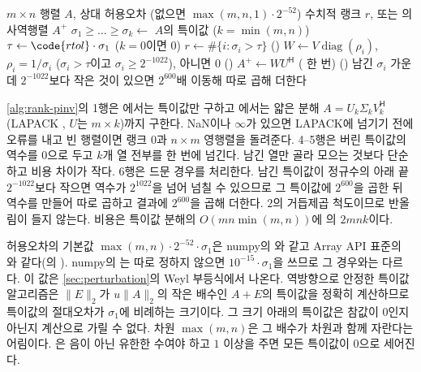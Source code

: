 \begin{algorithm}[htbp]
\begin{algorithmic}[1]
\Require $m\times n$ 행렬 $A$, 상대 허용오차  (없으면 $\max(m,n,1)\cdot2^{-52}$)
\Ensure 수치적 랭크 $r$, 또는 의사역행렬 $A^+$
\State $\sigma_1\ge\dots\ge\sigma_k\gets$ $A$의 특이값 ($k=\min(m,n)$) 
\State $\tau\gets\code{rtol}\cdot\sigma_1$ ($k=0$이면 $0$)
\State $r\gets\#\{i:\sigma_i>\tau\}$ 
\State () $W\gets V\operatorname{diag}(\rho_i)$, $\rho_i=1/\sigma_i$ ($\sigma_i>\tau$이고 $\sigma_i\ge2^{-1022}$), 아니면 $0$ 
\State () $A^+\gets WU^{\mathsf H}$ ( 한 번)
\State () 남긴 $\sigma_i$ 가운데 $2^{-1022}$보다 작은 것이 있으면 $2^{600}$배 이동해 따로 곱해 더한다
\end{algorithmic}
\caption{수치적 랭크와 의사역행렬 (stardust , )}
\label{alg:rank-pinv}
\end{algorithm}

\cref{alg:rank-pinv}의 1행은 에서는 특이값만 구하고 에서는 얇은 분해 $A=U_k\Sigma_kV_k^{\mathsf H}$(LAPACK , $U$는 $m\times k$)까지 구한다. NaN이나 $\infty$가 있으면 LAPACK에 넘기기 전에 오류를 내고 빈 행렬이면 랭크 $0$과 $n\times m$ 영행렬을 돌려준다. 4--5행은 버린 특이값의 역수를 $0$으로 두고 $k$개 열 전부를  한 번에 넘긴다. 남긴 열만 골라 모으는 것보다 단순하고 비용 차이가 작다. 6행은 드문 경우를 처리한다. 남긴 특이값이 정규수의 아래 끝 $2^{-1022}$보다 작으면 역수가 $2^{1022}$을 넘어 넘칠 수 있으므로 그 특이값에 $2^{600}$을 곱한 뒤 역수를 만들어 따로 곱하고 결과에 $2^{600}$을 곱해 더한다. $2$의 거듭제곱 척도이므로 반올림이 들지 않는다. 비용은 특이값 분해의 $O(mn\min(m,n))$에 의 $2mnk$이다.

허용오차의 기본값 $\max(m,n)\cdot2^{-52}\cdot\sigma_1$은 numpy의 와 같고 Array API 표준의 와 같다(의 ). numpy의 는 따로 정하지 않으면 $10^{-15}\cdot\sigma_1$을 쓰므로 그 경우와는 다르다. 이 값은 \cref{sec:perturbation}의 Weyl 부등식에서 나온다. 역방향으로 안정한 특이값 알고리즘은 $\|E\|_2$가 $u\|A\|_2$의 작은 배수인 $A+E$의 특이값을 정확히 계산하므로 특이값의 절대오차가 $\sigma_1$에 비례하는 크기이다. 그 크기 아래의 특이값은 참값이 $0$인지 아닌지 계산으로 가릴 수 없다. 차원 $\max(m,n)$은 그 배수가 차원과 함께 자란다는 어림이다. 은 음이 아닌 유한한 수여야 하고 $1$ 이상을 주면 모든 특이값이 $0$으로 세어진다.

